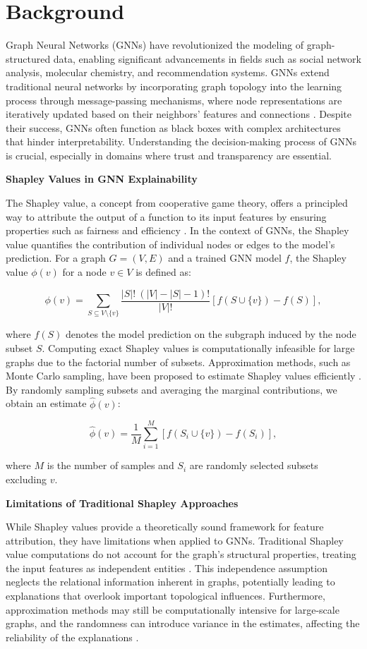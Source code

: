 \documentclass{article}
\begin{document}
\section{Background}
Graph Neural Networks (GNNs) have revolutionized the modeling of graph-structured data, enabling significant advancements in fields such as social network analysis, molecular chemistry, and recommendation systems. GNNs extend traditional neural networks by incorporating graph topology into the learning process through message-passing mechanisms, where node representations are iteratively updated based on their neighbors' features and connections \cite{arXiv:2207.12599v2}. Despite their success, GNNs often function as black boxes with complex architectures that hinder interpretability. Understanding the decision-making process of GNNs is crucial, especially in domains where trust and transparency are essential.

\textbf{Shapley Values in GNN Explainability}

The Shapley value, a concept from cooperative game theory, offers a principled way to attribute the output of a function to its input features by ensuring properties such as fairness and efficiency \cite{arXiv:2004.10066v1}. In the context of GNNs, the Shapley value quantifies the contribution of individual nodes or edges to the model's prediction. For a graph $G = (V, E)$ and a trained GNN model $f$, the Shapley value $\phi(v)$ for a node $v \in V$ is defined as:

\[
\phi(v) = \sum_{S \subseteq V \setminus \{v\}} \frac{|S|! \ (|V| - |S| - 1)!}{|V|!} \left[ f(S \cup \{v\}) - f(S) \right],
\]

where $f(S)$ denotes the model prediction on the subgraph induced by the node subset $S$. Computing exact Shapley values is computationally infeasible for large graphs due to the factorial number of subsets. Approximation methods, such as Monte Carlo sampling, have been proposed to estimate Shapley values efficiently \cite{arXiv:1903.10992v4}. By randomly sampling subsets and averaging the marginal contributions, we obtain an estimate $\hat{\phi}(v)$:

\[
\hat{\phi}(v) = \frac{1}{M} \sum_{i=1}^{M} \left[ f(S_i \cup \{v\}) - f(S_i) \right],
\]

where $M$ is the number of samples and $S_i$ are randomly selected subsets excluding $v$.

\textbf{Limitations of Traditional Shapley Approaches}

While Shapley values provide a theoretically sound framework for feature attribution, they have limitations when applied to GNNs. Traditional Shapley value computations do not account for the graph's structural properties, treating the input features as independent entities \cite{arXiv:2201.12380v5}. This independence assumption neglects the relational information inherent in graphs, potentially leading to explanations that overlook important topological influences. Furthermore, approximation methods may still be computationally intensive for large-scale graphs, and the randomness can introduce variance in the estimates, affecting the reliability of the explanations \cite{arXiv:1909.06143v2}.
\end{document}
